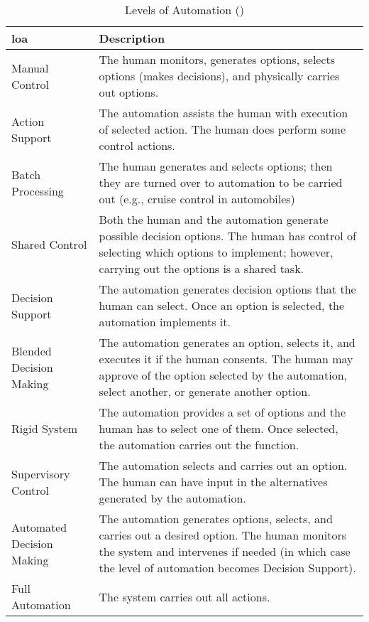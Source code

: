 \begin{table}\centering
  \caption[Levels of Automation]{Levels of Automation (\citet{Endsley1999})}
  \label{tab:autonomy_levels_endsley}
  \begin{tabularx}{\textwidth}{p{3cm} X}\toprule
    \acrshort{loa} & Description \\ \midrule
    Manual Control &
    The human monitors, generates options, selects options (makes decisions), and physically carries out options.\\
    Action Support &
    The automation assists the human with execution of selected action. The human does perform some control actions.\\
    Batch Processing &
    The human generates and selects options; then they are turned over to automation to be carried out (e.g., cruise control in automobiles)\\
    Shared Control &
    Both the human and the automation generate possible decision options. The human has control of selecting which options to implement; however, carrying out the options is a shared task.\\
    Decision Support &
    The automation generates decision options that the human can select. Once an option is selected, the automation implements it.\\
    Blended Decision Making & 
    The automation generates an option, selects it, and executes it if the human consents. The human may approve of the option selected by the automation, select another, or generate another option.\\
    Rigid System &      
    The automation provides a set of options and the human has to select one of them. Once selected, the automation carries out the function.\\
    Supervisory Control &
    The automation selects and carries out an option. The human can have input in the alternatives generated by the automation.\\
    Automated Decision Making & 
    The automation generates options, selects, and carries out a desired option. The human monitors the system and intervenes if needed (in which case the level of automation becomes Decision Support).\\
    Full Automation &   The system carries out all actions.\\ \bottomrule
  \end{tabularx}
\end{table}



